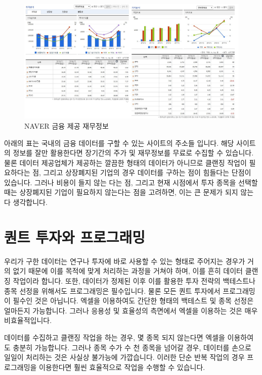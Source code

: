 \documentclass[]{book}
\begin{document}
\begin{figure}

{\centering \includegraphics[width=1\linewidth]{images/naver_finance_table} 

}

\caption{NAVER 금융 제공 재무정보}\label{fig:unnamed-chunk-3}
\end{figure}

아래의 표는 국내의 금융 데이터를 구할 수 있는 사이트의 주소들 입니다. 해당 사이트의 정보를 잘만 활용한다면 장기간의 주가 및 재무정보를 무료로 수집할 수 있습니다. 물론 데이터 제공업체가 제공하는 깔끔한 형태의 데이터가 아니므로 클랜징 작업이 필요하다는 점, 그리고 상장폐지된 기업의 경우 데이터를 구하는 점이 힘들다는 단점이 있습니다. 그러나 비용이 들지 않는 다는 점, 그리고 현재 시점에서 투자 종목을 선택할 때는 상장폐지된 기업이 필요하지 않는다는 점을 고려하면, 이는 큰 문제가 되지 않는다 생각합니다.

\hypertarget{section-3}{%
\section{퀀트 투자와 프로그래밍}\label{section-3}}

우리가 구한 데이터는 연구나 투자에 바로 사용할 수 있는 형태로 주어지는 경우가 거의 없기 때문에 이를 목적에 맞게 처리하는 과정을 거쳐야 하며, 이를 흔히 데이터 클랜징 작업이라 합니다. 또한, 데이터가 정제된 이후 이를 활용한 투자 전략의 백테스트나 종목 선정을 위해서도 프로그래밍은 필수입니다. 물론 모든 퀀트 투자에서 프로그래밍이 필수인 것은 아닙니다. 엑셀을 이용하여도 간단한 형태의 백테스트 및 종목 선정은 얼마든지 가능합니다. 그러나 응용성 및 효율성의 측면에서 엑셀을 이용하는 것은 매우 비효율적입니다.

데이터를 수집하고 클랜징 작업을 하는 경우, 몇 종목 되지 않는다면 엑셀을 이용하여도 충분히 가능합니다. 그러나 종목 수가 수 천 종목을 넘어갈 경우, 데이터를 손으로 일일이 처리하는 것은 사실상 불가능에 가깝습니다. 이러한 단순 반복 작업의 경우 프로그래밍을 이용한다면 훨씬 효율적으로 작업을 수행할 수 있습니다.
\end{document}
